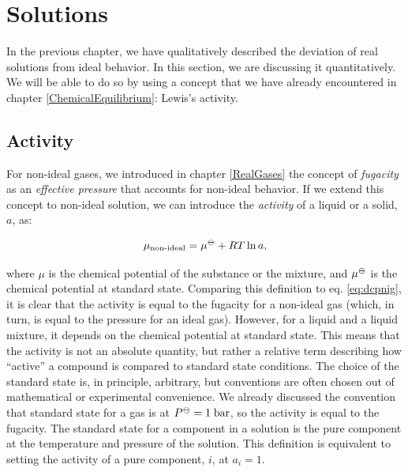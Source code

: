 \documentclass[
  9pt,
]{extbook}
\theoremstyle{definition}
\theoremstyle{definition}
\theoremstyle{definition}
\theoremstyle{remark}
\begin{document}
\renewcommand*{\standardstate}{{-\kern-6pt{\ominus}\kern-6pt-}}

\hypertarget{Solutions}{%
\chapter{Solutions}\label{Solutions}}

In the previous chapter, we have qualitatively described the deviation of real solutions from ideal behavior. In this section, we are discussing it quantitatively. We will be able to do so by using a concept that we have already encountered in chapter \ref{ChemicalEquilibrium}: Lewis's activity.

\hypertarget{activity}{%
\section{Activity}\label{activity}}

For non-ideal gases, we introduced in chapter \ref{RealGases} the concept of \emph{fugacity} as an \emph{effective pressure} that accounts for non-ideal behavior. If we extend this concept to non-ideal solution, we can introduce the \emph{activity} of a liquid or a solid, \(a\), as:

\begin{equation}
\mu_{\text{non-ideal}} = \mu^{{-\kern-6pt{\ominus}\kern-6pt-}} + RT \ln a,
\label{eq:act1}
\end{equation}

where \(\mu\) is the chemical potential of the substance or the mixture, and \(\mu^{{-\kern-6pt{\ominus}\kern-6pt-}}\) is the chemical potential at standard state. Comparing this definition to eq. \eqref{eq:dcpnig}, it is clear that the activity is equal to the fugacity for a non-ideal gas (which, in turn, is equal to the pressure for an ideal gas). However, for a liquid and a liquid mixture, it depends on the chemical potential at standard state. This means that the activity is not an absolute quantity, but rather a relative term describing how ``active'' a compound is compared to standard state conditions. The choice of the standard state is, in principle, arbitrary, but conventions are often chosen out of mathematical or experimental convenience. We already discussed the convention that standard state for a gas is at \(P^{{-\kern-6pt{\ominus}\kern-6pt-}}=1\;\text{bar}\), so the activity is equal to the fugacity. The standard state for a component in a solution is the pure component at the temperature and pressure of the solution. This definition is equivalent to setting the activity of a pure component, \(i\), at \(a_i=1\).
\end{document}
